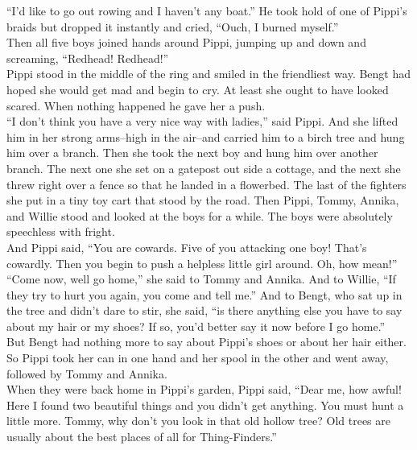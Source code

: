 \documentclass{standard}
\begin{document}
``I’d like to go out rowing and I haven’t any boat.” He took hold of one of Pippi’s braids but dropped it instantly and cried, ``Ouch, I burned myself.”\\

Then all five boys joined hands around Pippi, jumping up and down and screaming, ``Redhead! Redhead!”\\

Pippi stood in the middle of the ring and smiled in the friendliest way. Bengt had hoped she would get mad and begin to cry. At least she ought to have looked scared. When nothing happened he gave her a push.\\

``I don’t think you have a very nice way with ladies,” said Pippi. And she lifted him in her strong arms--high in the air--and carried him to a birch tree and hung him over a branch. Then she took the next boy and hung him over another branch. The next one she set on a gatepost out side a cottage, and the next she threw right over a fence so that he landed in a flowerbed. The last of the fighters she put in a tiny toy cart that stood by the road. Then Pippi, Tommy, Annika, and Willie stood and looked at the boys for a while. The boys were absolutely speechless with fright.\\

And Pippi said, ``You are cowards. Five of you attacking one boy! That’s cowardly. Then you begin to push a helpless little girl around. Oh, how mean!”\\

``Come now, well go home,” she said to Tommy and Annika. And to Willie, ``If they try to hurt you again, you come and tell me.” And to Bengt, who sat up in the tree and didn’t dare to stir, she said, ``is there anything else you have to say about my hair or my shoes? If so, you’d better say it now before I go home.”\\

But Bengt had nothing more to say about Pippi’s shoes or about her hair either. So Pippi took her can in one hand and her spool in the other and went away, followed by Tommy and Annika.\\

When they were back home in Pippi’s garden, Pippi said, ``Dear me, how awful! Here I found two beautiful things and you didn’t get anything. You must hunt a little more. Tommy, why don’t you look in that old hollow tree? Old trees are usually about the best places of all for Thing-Finders.”\\
\end{document}
